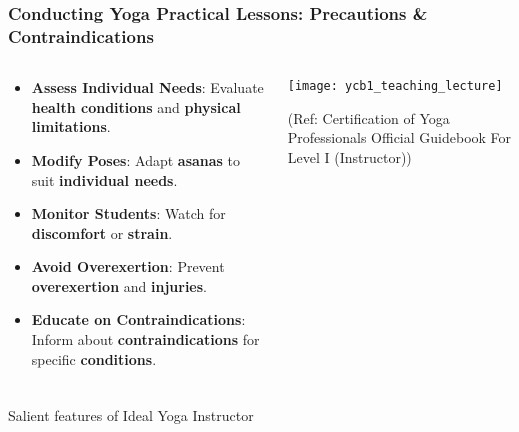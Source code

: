 \begin{frame}[fragile]\frametitle{Conducting Yoga Practical Lessons: Precautions \& Contraindications}
\begin{columns}
    \begin{column}[T]{0.5\linewidth}
      \begin{itemize}
        \item \textbf{Assess Individual Needs}: Evaluate \textbf{health conditions} and \textbf{physical limitations}.
        \item \textbf{Modify Poses}: Adapt \textbf{asanas} to suit \textbf{individual needs}.
        \item \textbf{Monitor Students}: Watch for \textbf{discomfort} or \textbf{strain}.
        \item \textbf{Avoid Overexertion}: Prevent \textbf{overexertion} and \textbf{injuries}.
        \item \textbf{Educate on Contraindications}: Inform about \textbf{contraindications} for specific \textbf{conditions}.
      \end{itemize}
    \end{column}
    \begin{column}[T]{0.5\linewidth}
        \begin{center}
        \texttt{[image: ycb1\_teaching\_lecture]}
		
		{\tiny (Ref: Certification  of Yoga Professionals Official Guidebook For Level I (Instructor))}	
        \end{center}	
    \end{column}
\end{columns}
\end{frame}


\begin{frame}[fragile]\frametitle{}
\begin{center}
{\Large Salient features of Ideal Yoga Instructor}
\end{center}
\end{frame}


